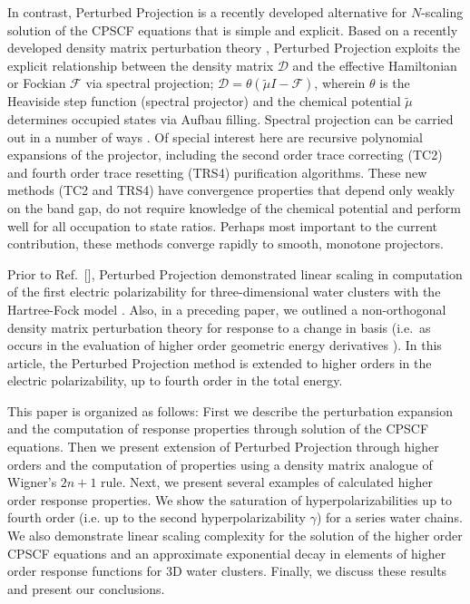 \documentclass[prl,aps,preprint,showpacs,superbib]{revtex4}
\begin{document}
In contrast, Perturbed Projection \cite{VWeber04} is a recently developed alternative 
for $N$-scaling solution of the CPSCF equations that is simple and explicit.  Based on a recently developed density 
matrix perturbation theory \cite{ANiklasson04}, Perturbed Projection exploits the explicit 
relationship between the density matrix $\mathcal{D}$ and the effective Hamiltonian or 
Fockian $\mathcal{F}$ via spectral projection; $\mathcal{D}=\theta(\tilde{\mu}I-\mathcal{F})$, 
wherein $\theta$ is the Heaviside step function (spectral projector)  and the chemical potential 
$\tilde{\mu}$ determines occupied states via Aufbau filling.   Spectral projection can be carried 
out in a number of ways \cite{ANiklasson02A,ANiklasson03,RMcWeeny60,WClinton69,APalser98,GBeylkin99,KNemeth00,AHolas01}.
Of special interest here are recursive polynomial expansions of the projector, including the second 
order trace correcting (TC2) \cite{ANiklasson02A} and fourth order trace resetting (TRS4) 
\cite{ANiklasson03} purification algorithms.  These new methods (TC2 and TRS4) have convergence 
properties that depend only weakly on the band gap, do not require knowledge of the chemical potential 
and perform well for all occupation to state ratios. 
Perhaps most important to the current contribution, these methods converge rapidly to smooth, 
monotone projectors.

Prior to Ref.~[], Perturbed Projection demonstrated linear scaling in 
computation of the first electric polarizability for three-dimensional water clusters with the 
Hartree-Fock model \cite{VWeber04}. Also, in a preceding paper, we outlined a non-orthogonal density matrix
perturbation theory \cite{ANiklasson05a} for response to a change in basis (i.e.~as occurs in 
the evaluation of higher order geometric energy derivatives \cite{RAmos89}). 
In this article, the Perturbed Projection method is extended to higher orders
in the electric polarizability, up to fourth order in the total energy.  

This paper is organized as follows: First we describe the perturbation expansion and 
the computation of response properties through solution of the CPSCF equations.
Then we present extension of Perturbed Projection through higher orders and the 
computation of properties using a density matrix analogue of Wigner's $2 n+1$ rule.
Next,  we present several examples of calculated higher order response properties.
We show the saturation of hyperpolarizabilities up to  fourth order (i.e. up to the 
second hyperpolarizability $\gamma$) for a series water chains.
We also  demonstrate linear scaling complexity for the solution of the higher order CPSCF
equations and an approximate exponential decay in elements of higher order response functions
for 3D water clusters.  Finally, we discuss these results and present our conclusions. 
\end{document}
